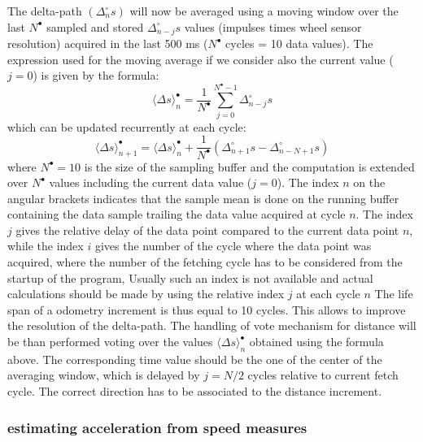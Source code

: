 The delta-path $(\Delta^\circ_n s )$ will now be averaged using a moving window over the last $N^\bullet$ sampled and stored $\Delta^\circ_{n-j} s$ values (impulses times wheel sensor resolution) acquired in the last 500 ms ($N^\bullet$ cycles = 10 data values).
The expression used for the moving average if we consider also the current value ($j=0$) is given by the formula:
\begin{equation}
\langle \Delta s\rangle^\bullet_n =\frac{1}{N^\bullet}\sum\limits_{j=0}^{N^\bullet-1} \Delta^\circ_{n-j} s 
\end{equation}
which can be updated recurrently at each cycle:
\begin{equation}
\langle \Delta s\rangle^\bullet_{n+1} =\langle \Delta s\rangle^\bullet_{n} +\frac{1}{N^\bullet}\left( \Delta^\circ_{n+1} s -  \Delta^\circ_{n-N+1} s \right)  
\end{equation}
where $N^\bullet=10$ is the size of the sampling buffer and the computation is extended over $N^\bullet$ values including the current data value ($j=0$). The index $n$ on the angular brackets indicates that the sample mean is done on the running buffer containing the data sample trailing the data value acquired at cycle $n$. The index $j$ gives the relative delay of the data point compared to the current data point $n$, while the index $i$ gives the number of the cycle where the data point was acquired, where the number of the fetching cycle has to be considered from the startup of the program, Usually such an index is not available and actual calculations should be made by using the relative index $j$ at each cycle $n$
The life span of a odometry increment is thus equal to 10 cycles. This allows to improve the resolution of the delta-path. The handling of vote mechanism for distance will be than performed voting over the values $\langle \Delta s\rangle^\bullet_{n} $ obtained using the formula above. The corresponding time value should be the one of the center of the averaging window, which is delayed by $j=N/2$ cycles relative to current fetch cycle.  The correct direction has to be associated to the distance increment.

\subsubsection{estimating acceleration from speed measures}

